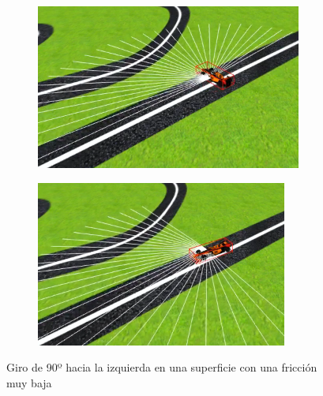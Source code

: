 \begin{itemize}
\begin{figure}[h!]
\begin{subfigure}[b]{0.5\textwidth}
  \end{subfigure}
    \hfill
    \hfill
  \begin{subfigure}[b]{0.5\textwidth}
    \includegraphics[width=\textwidth, height=\textwidth]{pistahielo3.png}
  \end{subfigure}
    \hfill
  \begin{subfigure}[b]{0.5\textwidth}
    \includegraphics[width=\textwidth, height=\textwidth]{pistahielo4.png}
  \end{subfigure}
\caption{Giro de 90º hacia la izquierda en una superficie con una fricción muy baja}
\label{fig:pistahielo}
\end{figure}
\end{itemize}

